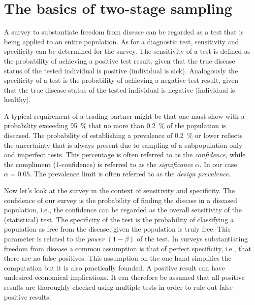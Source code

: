 \documentclass[nojss]{jss}
\begin{document}
%
%

\section{The basics of two-stage sampling} 
\label{sec:2-stage-sampling} 

A survey to substantiate freedom from disease can be regarded as a 
test that is being applied to an entire population. As for a 
diagnostic test, sensitivity and specificity can be determined for 
the survey. The sensitivity of a test is defined as the probability 
of achieving a positive test result, given that the true disease 
status of the tested individual is positive (individual is sick). 
Analogously the specificity of a test is the probability of 
achieving a negative test result, given that the true disease status 
of the tested individual is negative (individual is healthy). 

A typical requirement of a trading partner might be that one must 
show with a probability exceeding 95~\% that no more than 0.2~\% of 
the population is diseased. The probability of establishing a 
prevalence of 0.2~\% or lower reflects the uncertainty that is 
always present due to sampling of a subpopulation only and imperfect 
tests. This percentage is often referred to as the 
\emph{confidence}, while the compliment (1-confidence) is referred 
to as the \emph{significance} $\alpha$. In our case $\alpha = 0.05$. 
The prevalence limit is often referred to as the \emph{design 
prevalence}. 

Now let's look at the survey in the context of sensitivity and 
specificity. The confidence of our survey is the probability of 
finding the disease in a diseased population, i.e., the confidence 
can be regarded as the overall sensitivity of the (statistical) 
test. The specificity of the test is the probability of classifying 
a population as free from the disease, given the population is truly 
free. This parameter is related to the \emph{power} $(1-\beta)$ of 
the test. In surveys substantiating freedom from disease a common 
assumption is that of perfect specificity, i.e., that there are no 
false positives. This assumption on the one hand simplifies the 
computation but it is also practically founded. A positive result 
can have undesired economical implications. It can therefore be 
assumed that all positive results are thoroughly checked using 
multiple tests in order to rule out false positive results.  
\end{document}
